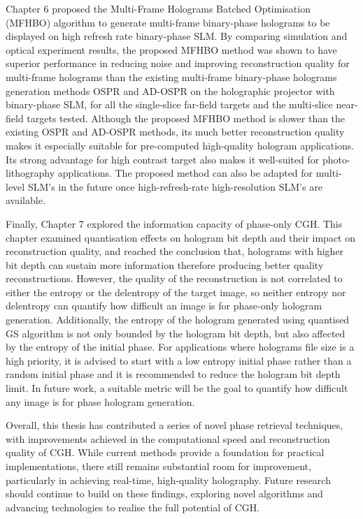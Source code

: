 Chapter 6 proposed the Multi-Frame Holograms Batched Optimisation (MFHBO) algorithm to generate multi-frame binary-phase holograms to be displayed on high refresh rate binary-phase SLM. By comparing simulation and optical experiment results, the proposed MFHBO method was shown to have superior performance in reducing noise and improving reconstruction quality for multi-frame holograms than the existing multi-frame binary-phase holograms generation methods OSPR and AD-OSPR on the holographic projector with binary-phase SLM, for all the single-slice far-field targets and the multi-slice near-field targets tested. Although the proposed MFHBO method is slower than the existing OSPR and AD-OSPR methods, its much better reconstruction quality makes it especially suitable for pre-computed high-quality hologram applications. Its strong advantage for high contrast target also makes it well-suited for photo-lithography applications. The proposed method can also be adapted for multi-level SLM's in the future once high-refresh-rate high-resolution SLM's are available.

Finally, Chapter 7 explored the information capacity of phase-only CGH. This chapter examined quantisation effects on hologram bit depth and their impact on reconstruction quality, and reached the conclusion that, holograms with higher bit depth can sustain more information therefore producing better quality reconstructions. However, the quality of the reconstruction is not correlated to either the entropy or the delentropy of the target image, so neither entropy nor delentropy can quantify how difficult an image is for phase-only hologram generation. Additionally, the entropy of the hologram generated using quantised GS algorithm is not only bounded by the hologram bit depth, but also affected by the entropy of the initial phase. For applications where holograms file size is a high priority, it is advised to start with a low entropy initial phase rather than a random initial phase and it is recommended to reduce the hologram bit depth limit. In future work, a suitable metric will be the goal to quantify how difficult any image is for phase hologram generation.

Overall, this thesis has contributed a series of novel phase retrieval techniques, with improvements achieved in the computational speed and reconstruction quality of CGH. While current methods provide a foundation for practical implementations, there still remains substantial room for improvement, particularly in achieving real-time, high-quality holography. Future research should continue to build on these findings, exploring novel algorithms and advancing technologies to realise the full potential of CGH.
